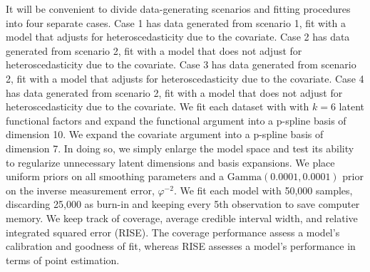 \documentclass[useAMS,referee,usenatbib]{biom}
\begin{document}
It will be convenient to divide data-generating scenarios and fitting procedures into four separate cases. Case 1 has data generated from scenario 1, fit with a model that adjusts for heteroscedasticity due to the covariate. Case 2 has data generated from scenario 2, fit with a model that does not adjust for heteroscedasticity due to the covariate. Case 3 has data generated from scenario 2, fit with a model that adjusts for heteroscedasticity due to the covariate. Case 4 has data generated from scenario 2, fit with a model that does not adjust for heteroscedasticity due to the covariate. We fit each dataset with with $k = 6$ latent functional factors and expand the functional argument into a p-spline basis of dimension 10. We expand the covariate argument into a p-spline basis of dimension 7. In doing so, we simply enlarge the model space and test its ability to regularize unnecessary latent dimensions and basis expansions. We place uniform priors on all smoothing parameters and a $\text{Gamma}(0.0001, 0.0001)$ prior on the inverse measurement error, $\varphi^{-2}$. We fit each model with 50,000 samples, discarding 25,000 as burn-in and keeping every 5th observation to save computer memory. We keep track of coverage, average credible interval width, and relative integrated squared error (RISE). The coverage performance assess a model's calibration and goodness of fit, whereas RISE assesses a model's performance in terms of point estimation. 
\end{document}
